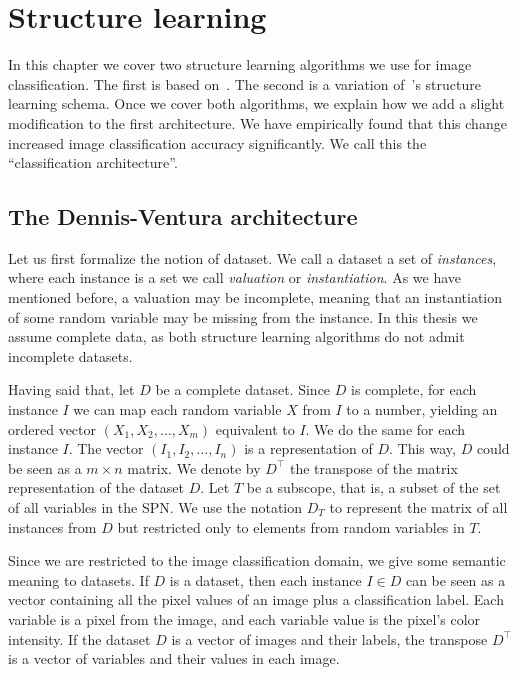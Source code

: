 \chapter{Structure learning}\label{chp:structure}

In this chapter we cover two structure learning algorithms we use for image classification. The
first is based on~\cite{clustering}. The second is a variation of~\cite{gens-domingos}'s structure
learning schema. Once we cover both algorithms, we explain how we add a slight modification to the
first architecture. We have empirically found that this change increased image classification
accuracy significantly. We call this the ``classification architecture''.

\section{The Dennis-Ventura architecture}\label{section:dv}

Let us first formalize the notion of dataset. We call a dataset a set of \textit{instances}, where
each instance is a set we call \textit{valuation} or \textit{instantiation}. As we have mentioned
before, a valuation may be incomplete, meaning that an instantiation of some random variable may be
missing from the instance. In this thesis we assume complete data, as both structure learning
algorithms do not admit incomplete datasets.

Having said that, let $D$ be a complete dataset. Since $D$ is complete, for each instance $I$ we
can map each random variable $X$ from $I$ to a number, yielding an ordered vector $(X_1,X_2,\ldots,
X_m)$ equivalent to $I$. We do the same for each instance $I$. The vector $(I_1,I_2,\ldots, I_n)$
is a representation of $D$. This way, $D$ could be seen as a $m\times n$ matrix. We denote by
$D^\intercal$ the transpose of the matrix representation of the dataset $D$.  Let $T$ be a
subscope, that is, a subset of the set of all variables in the SPN\@. We use the notation $D_T$ to
represent the matrix of all instances from $D$ but restricted only to elements from random
variables in $T$.

Since we are restricted to the image classification domain, we give some semantic meaning to
datasets. If $D$ is a dataset, then each instance $I\in D$ can be seen as a vector containing all
the pixel values of an image plus a classification label. Each variable is a pixel from the image,
and each variable value is the pixel's color intensity. If the dataset $D$ is a vector of images
and their labels, the transpose $D^\intercal$ is a vector of variables and their values in each
image.

